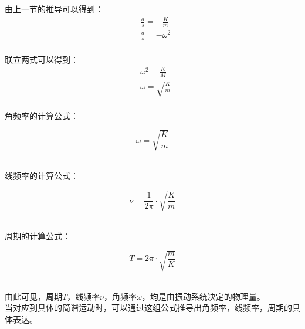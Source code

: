 \documentclass[UTF8]{ctexart}
\begin{document}
\newpage

    由上一节的推导可以得到：
    \begin{align}
        &\frac{a}{s}=-\frac{K}{m}\\[4mm]
        &\frac{a}{s}=-\omega^2
    \end{align}\\
    联立两式可以得到：
    \begin{align}
        &\omega^2=\frac{K}{M}\\[4mm]
        &\omega=\sqrt{\frac{K}{m}}
    \end{align}\\
    角频率的计算公式：
    \begin{large}
        \begin{equation*}
            \omega=\sqrt{\frac{K}{m}}
        \end{equation*}
    \end{large}\\
    线频率的计算公式：
    \begin{large}
        \begin{equation*}
            \nu=\frac{1}{2\pi}\cdot\sqrt{\frac{K}{m}}
        \end{equation*}
    \end{large}\\
    周期的计算公式：
    \begin{large}
        \begin{equation*}
            T=2\pi\cdot\sqrt{\frac{m}{K}}
        \end{equation*}
    \end{large}\\
    由此可见，周期$T$，线频率$\nu$，角频率$\omega$，均是由振动系统决定的物理量。\\[3mm]
    当对应到具体的简谐运动时，可以通过这组公式推导出角频率，线频率，周期的具体表达。\\

\newpage
\end{document}
